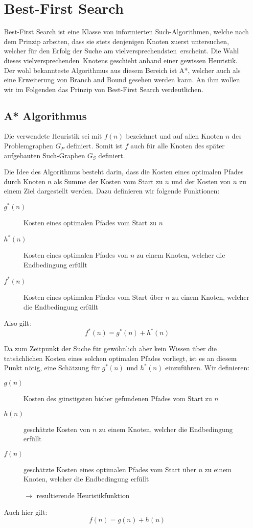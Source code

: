 \section{Best-First Search} \label{BFS}

Best-First Search ist eine Klasse von informierten Such-Algorithmen, welche nach dem Prinzip arbeiten, dass sie stets denjenigen Knoten zuerst untersuchen, welcher für den Erfolg der Suche am \glqq vielversprechendsten\grqq\ erscheint. Die Wahl dieses \glqq vielversprechenden\grqq\ Knotens geschieht anhand einer gewissen Heuristik.
Der wohl bekannteste Algorithmus aus diesem Bereich ist A*, welcher auch als eine Erweiterung von Branch and Bound gesehen werden kann. An ihm wollen wir im Folgenden das Prinzip von Best-First Search verdeutlichen.

\subsection{A* Algorithmus}

Die verwendete Heuristik sei mit $f(n)$ bezeichnet und auf allen Knoten $n$ des Problemgraphen $G_{P}$ definiert. Somit ist $f$ auch für alle Knoten des später aufgebauten Such-Graphen $G_{S}$ definiert.

Die Idee des Algorithmus besteht darin, dass die Kosten eines optimalen Pfades durch Knoten $n$ als Summe der Kosten vom Start zu $n$ und der Kosten von $n$ zu einem Ziel dargestellt werden.
Dazu definieren wir folgende Funktionen:

\begin{description}
	\item[$g^{*}(n)$]{Kosten eines optimalen Pfades vom Start zu $n$}
	\item[$h^{*}(n)$]{Kosten eines optimalen Pfades von $n$ zu einem Knoten, welcher die Endbedingung erfüllt}
	\item[$f^{*}(n)$]{Kosten eines optimalen Pfades vom Start über $n$ zu einem Knoten, welcher die Endbedingung erfüllt}
\end{description}
Also gilt: \[f^{*}(n)=g^{*}(n)+h^{*}(n)\]


Da zum Zeitpunkt der Suche für gewöhnlich aber kein Wissen über die tatsächlichen Kosten eines solchen optimalen Pfades vorliegt, ist es an diesem Punkt nötig, eine Schätzung für $g^{*}(n)$ und $h^{*}(n)$ einzuführen.
Wir definieren:

\begin{description}
	\item[$g(n)$]{Kosten des günstigsten bisher gefundenen Pfades vom Start zu $n$}
	\item[$ h(n)$]{geschätzte Kosten von $n$ zu einem Knoten, welcher die Endbedingung erfüllt}
	\item[$ f(n)$]{geschätzte Kosten eines optimalen Pfades vom Start über $n$ zu einem Knoten, welcher die Endbedingung erfüllt

		$\rightarrow$ resultierende Heuristikfunktion}
\end{description}
Auch hier gilt: \[f(n)=g(n)+h(n)\]

